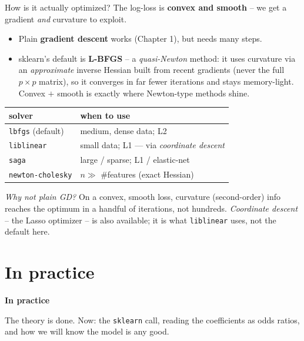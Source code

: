 \documentclass[aspectratio=169]{beamer}
\begin{document}
\begin{frame}{How is it actually optimized?}
  The log-loss is \textbf{convex and smooth} -- we get a gradient \emph{and} curvature
  to exploit.
  \begin{itemize}\small
    \item Plain \textbf{gradient descent} works (Chapter 1), but needs many steps.
    \item sklearn's default is \textbf{L-BFGS} -- a \emph{quasi-Newton} method: it uses
      curvature via an \emph{approximate} inverse Hessian built from recent gradients
      (never the full $p\times p$ matrix), so it converges in far fewer iterations and
      stays memory-light. Convex $+$ smooth is exactly where Newton-type methods shine.
  \end{itemize}
  \vfill
  \begin{center}\small
    \renewcommand{\arraystretch}{1.2}
    \begin{tabular}{l l}
      \textbf{solver} & \textbf{when to use} \\
      \hline
      \texttt{lbfgs} (default) & medium, dense data; L2 \\
      \texttt{liblinear} & small data; L1 --- via \emph{coordinate descent} \\
      \texttt{saga} & large / sparse; L1 / elastic-net \\
      \texttt{newton-cholesky} & $n \gg$ \#features (exact Hessian) \\
      \hline
    \end{tabular}
  \end{center}
  \vskip 2pt
  \footnotesize \emph{Why not plain GD?} On a convex, smooth loss, curvature
  (second-order) info reaches the optimum in a handful of iterations, not hundreds.
  \emph{Coordinate descent} -- the Lasso optimizer -- is also available; it is what
  \texttt{liblinear} uses, not the default here.
\end{frame}

\section{In practice}

\begin{frame}[plain]
  \vfill
  \begin{center}
    {\Large\color{popblue}\textbf{In practice}}\\[0.9em]
    \begin{minipage}{0.82\textwidth}\centering\small
      The theory is done. Now: the \texttt{sklearn} call, reading the coefficients as
      odds ratios, and how we will know the model is any good.
    \end{minipage}
  \end{center}
  \vfill
\end{frame}
\end{document}
